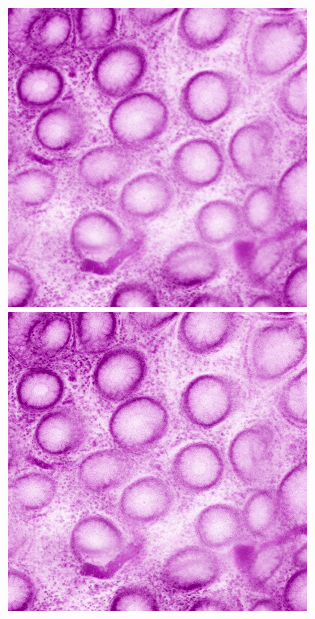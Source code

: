 \begin{figure}[H]
\begin{minipage}{0.24\columnwidth}
		\includegraphics[clip, width=\linewidth]{fig/preprocessing/data_aug/color/SHARPNESS/SHARPNESS_0_50}
	\end{minipage}
	\begin{minipage}{0.24\columnwidth}
		\centering
		\includegraphics[clip, width=\linewidth]{fig/preprocessing/data_aug/color/SHARPNESS/SHARPNESS_1_00}

\end{minipage}
\end{figure}
